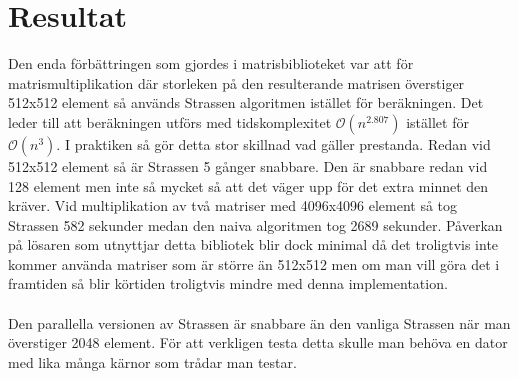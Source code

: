 \section{Resultat}
Den enda förbättringen som gjordes i matrisbiblioteket var att för matrismultiplikation där storleken på den resulterande matrisen överstiger 512x512 element så används Strassen algoritmen istället för beräkningen. Det leder till att beräkningen utförs med tidskomplexitet $\mathcal{O}(n^{2.807})$ istället för $\mathcal{O}(n^{3})$. I praktiken så gör detta stor skillnad vad gäller prestanda. Redan vid 512x512 element så är Strassen 5 gånger snabbare. Den är snabbare redan vid 128 element men inte så mycket så att det väger upp för det extra minnet den kräver. Vid multiplikation av två matriser med 4096x4096 element så tog Strassen 582 sekunder medan den naiva algoritmen tog 2689 sekunder. Påverkan på lösaren som utnyttjar detta bibliotek blir dock minimal då det troligtvis inte kommer använda matriser som är större än 512x512 men om man vill göra det i framtiden så blir körtiden troligtvis mindre med denna implementation.
\\
\\
Den parallella versionen av Strassen är snabbare än den vanliga Strassen när man överstiger 2048 element. För att verkligen testa detta skulle man behöva en dator med lika många kärnor som trådar man testar. 